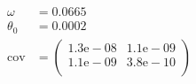 \begin{align}
	\omega &= 0.0665 \\
	\theta_0 &= 0.0002 \\
	\mathrm{cov} &=
	\begin{pmatrix}
		1.3\mathrm{e}-08 &1.1\mathrm{e}-09 \\
		1.1\mathrm{e}-09 &3.8\mathrm{e}-10 \\
	\end{pmatrix} 
\end{align}

